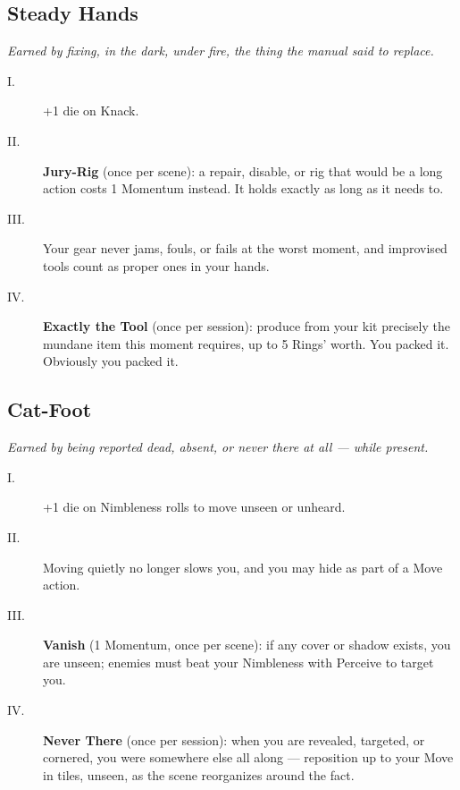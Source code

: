\subsection{Steady Hands}
\textit{Earned by fixing, in the dark, under fire, the thing the manual said to replace.}
\begin{description}
    \item[I.] +1 die on Knack.
    \item[II.] \textbf{Jury-Rig} (once per scene): a repair, disable, or rig that would be a long action costs 1 Momentum instead. It holds exactly as long as it needs to.
    \item[III.] Your gear never jams, fouls, or fails at the worst moment, and improvised tools count as proper ones in your hands.
    \item[IV.] \textbf{Exactly the Tool} (once per session): produce from your kit precisely the mundane item this moment requires, up to 5 Rings' worth. You packed it. Obviously you packed it.
\end{description}

\subsection{Cat-Foot}
\textit{Earned by being reported dead, absent, or never there at all --- while present.}
\begin{description}
    \item[I.] +1 die on Nimbleness rolls to move unseen or unheard.
    \item[II.] Moving quietly no longer slows you, and you may hide as part of a Move action.
    \item[III.] \textbf{Vanish} (1 Momentum, once per scene): if any cover or shadow exists, you are unseen; enemies must beat your Nimbleness with Perceive to target you.
    \item[IV.] \textbf{Never There} (once per session): when you are revealed, targeted, or cornered, you were somewhere else all along --- reposition up to your Move in tiles, unseen, as the scene reorganizes around the fact.
\end{description}

